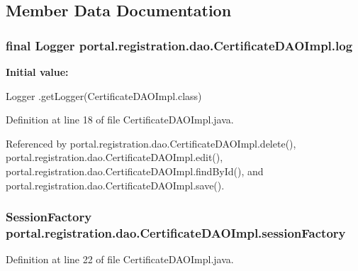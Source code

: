 \subsection{Member Data Documentation}
\hypertarget{classportal_1_1registration_1_1dao_1_1CertificateDAOImpl_a2e41d81ff0e96ed91c4793080fc82071}{
\subsubsection[{log}]{\setlength{\rightskip}{0pt plus 5cm}final Logger {\bf portal.registration.dao.CertificateDAOImpl.log}}}
\label{classportal_1_1registration_1_1dao_1_1CertificateDAOImpl_a2e41d81ff0e96ed91c4793080fc82071}
{\bfseries Initial value:}
\begin{DoxyCode}
 Logger
                        .getLogger(CertificateDAOImpl.class)
\end{DoxyCode}


Definition at line 18 of file CertificateDAOImpl.java.



Referenced by portal.registration.dao.CertificateDAOImpl.delete(), portal.registration.dao.CertificateDAOImpl.edit(), portal.registration.dao.CertificateDAOImpl.findById(), and portal.registration.dao.CertificateDAOImpl.save().

\hypertarget{classportal_1_1registration_1_1dao_1_1CertificateDAOImpl_a14bdf753d92377fe970839b6f362ef4f}{
\subsubsection[{sessionFactory}]{\setlength{\rightskip}{0pt plus 5cm}SessionFactory {\bf portal.registration.dao.CertificateDAOImpl.sessionFactory}}}
\label{classportal_1_1registration_1_1dao_1_1CertificateDAOImpl_a14bdf753d92377fe970839b6f362ef4f}


Definition at line 22 of file CertificateDAOImpl.java.



